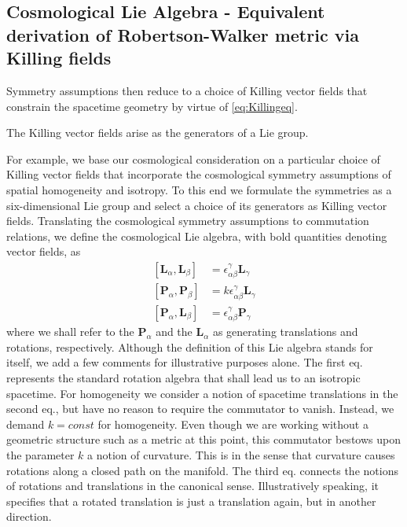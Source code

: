 \subsection{Cosmological Lie Algebra - Equivalent derivation of Robertson-Walker metric via Killing fields}
Symmetry assumptions then reduce to a choice
of Killing vector fields that constrain the spacetime geometry by virtue of \ref{eq:Killingeq}. 
\begin{statements}
	The Killing vector fields arise as the generators
	of a Lie group.
\end{statements}
For example, we base our cosmological consideration on a particular choice of Killing vector fields that
incorporate the cosmological symmetry assumptions of spatial homogeneity and isotropy.
To this end we formulate the symmetries as a six-dimensional Lie group and select a
choice of its generators as Killing vector fields. Translating the cosmological symmetry
assumptions to commutation relations, we define the cosmological Lie algebra, with bold quantities denoting vector fields, as
\begin{align}
	\label{eq:CosmologicalLieAlgebra}
	[\mathbf{L}_\alpha,\mathbf{L}_\beta]&= \epsilon^\gamma_{\alpha \beta} \mathbf{L}_\gamma \\
	[\mathbf{P}_\alpha, \mathbf{P}_\beta] &= k \epsilon^\gamma_{\alpha \beta} \mathbf{L}_\gamma \\
	[\mathbf{P}_\alpha, \mathbf{L}_\beta]&=\epsilon^\gamma_{\alpha \beta} \mathbf{P}_\gamma
\end{align}
where we shall refer to the $\mathbf{P}_α$ and the $\mathbf{L}_α$ as generating translations and rotations, respectively. Although the definition of this Lie algebra stands for itself, we add a few
comments for illustrative purposes alone. The first eq. represents the standard rotation
algebra that shall lead us to an isotropic spacetime. For homogeneity we consider a notion of spacetime translations in the second eq., but have no reason to require the commutator to
vanish. Instead, we demand $k = const$ for homogeneity. Even though we are working
without a geometric structure such as a metric at this point, this commutator bestows
upon the parameter $k$ a notion of curvature. This is in the sense that curvature causes
rotations along a closed path on the manifold. The third eq. connects the notions of rotations and translations in the canonical sense. Illustratively speaking, it specifies that a
rotated translation is just a translation again, but in another direction.\\
